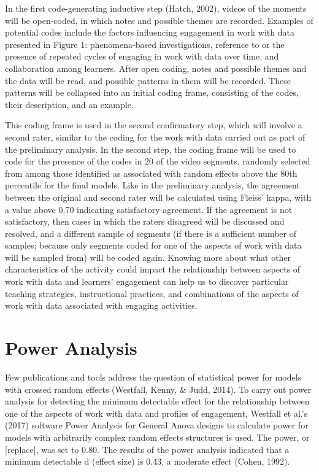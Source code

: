\documentclass[]{msu-thesis}
\theoremstyle{definition}
\theoremstyle{definition}
\theoremstyle{definition}
\theoremstyle{remark}
\begin{document}
In the first code-generating inductive step (Hatch, 2002), videos of the
moments will be open-coded, in which notes and possible themes are
recorded. Examples of potential codes include the factors influencing
engagement in work with data presented in Figure 1: phenomena-based
investigations, reference to or the presence of repeated cycles of
engaging in work with data over time, and collaboration among learners.
After open coding, notes and possible themes and the data will be read,
and possible patterns in them will be recorded. These patterns will be
collapsed into an initial coding frame, consisting of the codes, their
description, and an example.

This coding frame is used in the second confirmatory step, which will
involve a second rater, similar to the coding for the work with data
carried out as part of the preliminary analysis. In the second step, the
coding frame will be used to code for the presence of the codes in 20 of
the video segments, randomly selected from among those identified as
associated with random effects above the 80th percentile for the final
models. Like in the preliminary analysis, the agreement between the
original and second rater will be calculated using Fleiss' kappa, with a
value above 0.70 indicating satisfactory agreement. If the agreement is
not satisfactory, then cases in which the raters disagreed will be
discussed and resolved, and a different sample of segments (if there is
a sufficient number of samples; because only segments coded for one of
the aspects of work with data will be sampled from) will be coded again.
Knowing more about what other characteristics of the activity could
impact the relationship between aspects of work with data and learners'
engagement can help us to discover particular teaching strategies,
instructional practices, and combinations of the aspects of work with
data associated with engaging activities.

\section{Power Analysis}\label{power-analysis}

Few publications and tools address the question of statistical power for
models with crossed random effects (Westfall, Kenny, \& Judd, 2014). To
carry out power analysis for detecting the minimum detectable effect for
the relationship between one of the aspects of work with data and
profiles of engagement, Westfall et al.'s (2017) software Power Analysis
for General Anova designs to calculate power for models with arbitrarily
complex random effects structures is used. The power, or {[}replace{]},
was set to 0.80. The results of the power analysis indicated that a
minimum detectable d (effect size) is 0.43, a moderate effect (Cohen,
1992).
\end{document}
